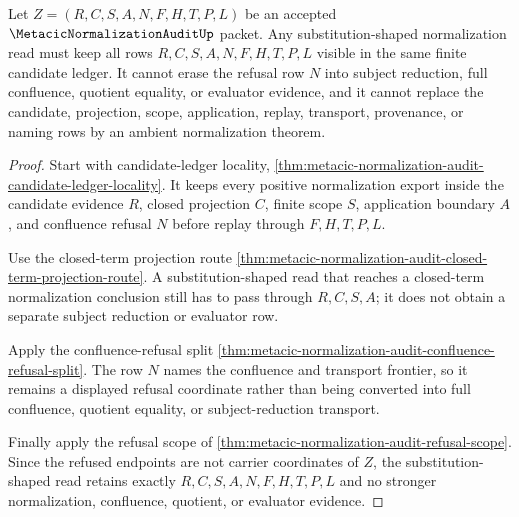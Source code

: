 \begin{theorem}
\label{thm:metacic-normalization-audit-candidate-substitution-scope}
Let $Z=(R,C,S,A,N,F,H,T,P,L)$ be an accepted
$\MetacicNormalizationAuditUp$ packet. Any substitution-shaped normalization
read must keep all rows $R,C,S,A,N,F,H,T,P,L$ visible in the same finite
candidate ledger. It cannot erase the refusal row $N$ into subject reduction,
full confluence, quotient equality, or evaluator evidence, and it cannot
replace the candidate, projection, scope, application, replay, transport,
provenance, or naming rows by an ambient normalization theorem.
\end{theorem}
\begin{proof}
Start with candidate-ledger locality,
\autoref{thm:metacic-normalization-audit-candidate-ledger-locality}. It keeps
every positive normalization export inside the candidate evidence $R$, closed
projection $C$, finite scope $S$, application boundary $A$, and confluence
refusal $N$ before replay through $F,H,T,P,L$.

Use the closed-term projection route
\autoref{thm:metacic-normalization-audit-closed-term-projection-route}. A
substitution-shaped read that reaches a closed-term normalization conclusion
still has to pass through $R,C,S,A$; it does not obtain a separate subject
reduction or evaluator row.

Apply the confluence-refusal split
\autoref{thm:metacic-normalization-audit-confluence-refusal-split}. The row
$N$ names the confluence and transport frontier, so it remains a displayed
refusal coordinate rather than being converted into full confluence, quotient
equality, or subject-reduction transport.

Finally apply the refusal scope of
\autoref{thm:metacic-normalization-audit-refusal-scope}. Since the refused
endpoints are not carrier coordinates of $Z$, the substitution-shaped read
retains exactly $R,C,S,A,N,F,H,T,P,L$ and no stronger normalization,
confluence, quotient, or evaluator evidence.
\end{proof}

